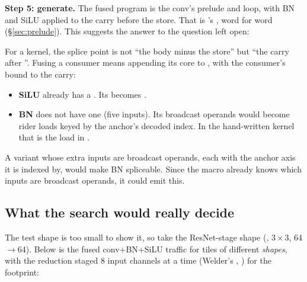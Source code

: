 \textbf{Step 5: generate.} The fused program is the conv's prelude and loop, with
BN and SiLU applied to the carry before the store. That is
's , word for word (\S\ref{sec:prelude}).
This suggests the answer to the question  left open:

\begin{note}
For a  kernel, the splice point is not ``the body minus
the store'' but ``the carry after ''. Fusing a consumer means appending
its core to , with the consumer's  bound to the carry:
\begin{itemize}
\item \textbf{SiLU} already has a . Its  becomes
  .
\item \textbf{BN} does not have one (five inputs). Its broadcast operands would
  become rider loads keyed by the anchor's decoded index. In the hand-written
  kernel that is the  load in .
\end{itemize}
A  variant whose extra inputs are broadcast operands, each with the
anchor axis it is indexed by, would make BN spliceable. Since the macro already knows
which inputs are broadcast operands, it could emit this.
\end{note}

\subsection{What the search would really decide}
\label{sec:welder-search}

The test shape is too small to show it, so take the ResNet-stage shape
(\code{[32, 64, 56, 56]}, $3\times3$, 64$\to$64). Below is the fused
conv+BN+SiLU traffic for tiles of different \emph{shapes}, with the reduction staged
8 input channels at a time (Welder's , ) for the footprint:

